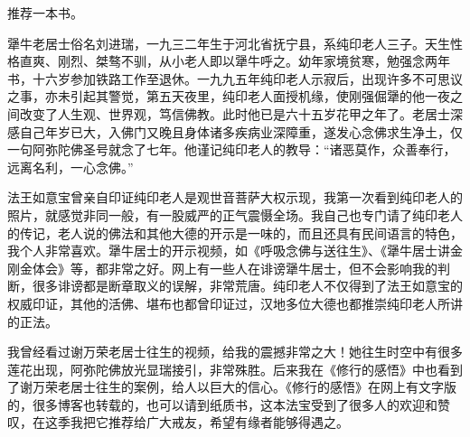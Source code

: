 推荐一本书。

\begin{book}
    犟牛老居士俗名刘进瑞，一九三二年生于河北省抚宁县，系纯印老人三子。天生性格直爽、刚烈、桀骜不驯，从小老人即以犟牛呼之。幼年家境贫寒，勉强念两年书，十六岁参加铁路工作至退休。一九九五年纯印老人示寂后，出现许多不可思议之事，亦未引起其警觉，第五天夜里，纯印老人面授机缘，使刚强倔犟的他一夜之间改变了人生观、世界观，笃信佛教。此时他已是六十五岁花甲之年了。老居士深感自己年岁已大，入佛门又晚且身体诸多疾病业深障重，遂发心念佛求生净土，仅一句阿弥陀佛圣号就念了七年。他谨记纯印老人的教导：“诸恶莫作，众善奉行，远离名利，一心念佛。”

    法王如意宝曾亲自印证纯印老人是观世音菩萨大权示现，我第一次看到纯印老人的照片，就感觉非同一般，有一股威严的正气震慑全场。我自己也专门请了纯印老人的传记，老人说的佛法和其他大德的开示是一味的，而且还具有民间语言的特色，我个人非常喜欢。犟牛居士的开示视频，如《呼吸念佛与送往生》、《犟牛居士讲金刚金体会》等，都非常之好。网上有一些人在诽谤犟牛居士，但不会影响我的判断，很多诽谤都是断章取义的误解，非常荒唐。纯印老人不仅得到了法王如意宝的权威印证，其他的活佛、堪布也都曾印证过，汉地多位大德也都推崇纯印老人所讲的正法。

    我曾经看过谢万荣老居士往生的视频，给我的震撼非常之大！她往生时空中有很多莲花出现，阿弥陀佛放光显瑞接引，非常殊胜。后来我在《修行的感悟》中也看到了谢万荣老居士往生的案例，给人以巨大的信心。《修行的感悟》在网上有文字版的，很多博客也转载的，也可以请到纸质书，这本法宝受到了很多人的欢迎和赞叹，在这季我把它推荐给广大戒友，希望有缘者能够得遇之。
\end{book}
